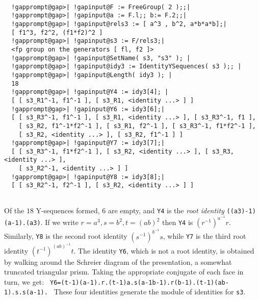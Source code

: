 \documentclass[a4paper,11pt]{report}
\begin{document}
{{ 
\begin{Verbatim}[commandchars=!@|,fontsize=\small,frame=single,label=Example]
  
  !gapprompt@gap>| !gapinput@F := FreeGroup( 2 );;|
  !gapprompt@gap>| !gapinput@a := F.l;; b:= F.2;;|
  !gapprompt@gap>| !gapinput@rels3 := [ a^3 , b^2, a*b*a*b];|
  [ f1^3, f2^2, (f1*f2)^2 ]
  !gapprompt@gap>| !gapinput@s3 := F/rels3;|
  <fp group on the generators [ fl, f2 ]> 
  !gapprompt@gap>| !gapinput@SetName( s3, "s3" ); |
  !gapprompt@gap>| !gapinput@idy3 := IdentityYSequences( s3 );; |
  !gapprompt@gap>| !gapinput@Length( idy3 ); |
  18
  !gapprompt@gap>| !gapinput@Y4 := idy3[4]; |
  [ [ s3_R1^-1, f1^-1 ], [ s3_R1, <identity ...> ] ]
  !gapprompt@gap>| !gapinput@Y6 := idy3[6];|
  [ [ s3_R3^-1, f1^-1 ], [ s3_R1, <identity ...> ], [ s3_R3^-1, f1 ],
    [ s3_R2, f1^-1*f2^-1 ], [ s3_R1, f2^-1 ], [ s3_R3^-1, f1*f2^-1 ],
    [ s3_R2, <identity ...> ], [ s3_R2, f1^-1 ] ]
  !gapprompt@gap>| !gapinput@Y7 := idy3[7];|
  [ [ s3_R3^-1, f1*f2^-1 ], [ s3_R2, <identity ...> ], [ s3_R3, <identity ...> ],
    [ s3_R2^-1, <identity ...> ] ]
  !gapprompt@gap>| !gapinput@Y8 := idy3[8];|
  [ [ s3_R2^-1, f2^-1 ], [ s3_R2, <identity ...> ] ]
  
\end{Verbatim}
 Of the $18$ Y-sequences formed, $6$ are empty, and \texttt{Y4} is the \emph{root identity} \texttt{((a\texttt{}3)\texttt{}-1)\texttt{}(a\texttt{}-1).(a\texttt{}3)}. If we write $r=a^3, s=b^2, t=(ab)^2$ then \texttt{Y4} is $(r^{-1})^{a^{-1}}r$. Similarly, \texttt{Y8} is the second root identity $(s^{-1})^{b^{-1}}s$, while \texttt{Y7} is the third root identity $(t^{-1})^{(ab)^{-1}}t$. The identity \texttt{Y6}, which is not a root identity, is obtained by walking around the Schreier
diagram of the presentation, a somewhat truncated triangular prism. Taking the
appropriate conjugate of each face in turn, we get: \texttt{ Y6=(t\texttt{}-1)\texttt{}(a\texttt{}-1).r.(t\texttt{}-1)\texttt{}a.s\texttt{}(a\texttt{}-1b\texttt{}-1).r\texttt{}(b\texttt{}-1).(t\texttt{}-1)\texttt{}(ab\texttt{}-1).s.s\texttt{}(a\texttt{}-1). } These four identities generate the module of identities for \texttt{s3}. 

 
\begin{Verbatim}[commandchars=!@|,fontsize=\small,frame=single,label=Example]
  

\end{Verbatim}}}
\end{document}
